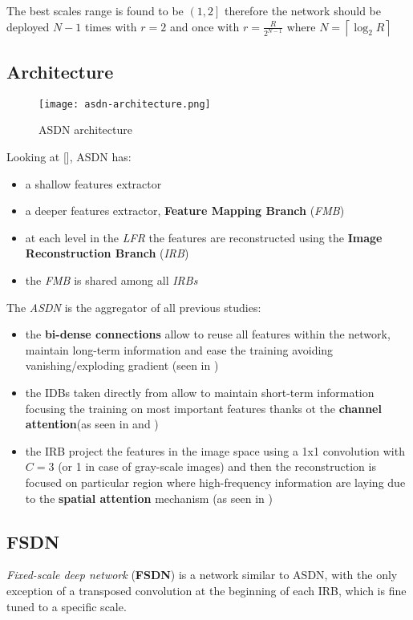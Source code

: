 The best scales range is found to be $\left(1,2 \right]$ therefore the network should be deployed $N-1$ times with $r=2$ and once with $r=\frac{R}{2^{N-1}}$ where $N=\left\lceil\log_2 R \right\rceil$

\subsection{Architecture}
\begin{figure}
    \centering
    \texttt{[image: asdn-architecture.png]}
    \caption{ASDN architecture}\label{asdn:model}
\end{figure}

Looking at [], ASDN has:
\begin{itemize}
    \item a shallow features extractor
    \item a deeper features extractor, \textbf{Feature Mapping Branch} (\textit{FMB})
    \item at each level in the \textit{LFR} the features are reconstructed using the \textbf{Image Reconstruction Branch} (\textit{IRB})
    \item the \textit{FMB} is shared among all \textit{IRBs}
\end{itemize}

The \textit{ASDN} is the aggregator of all previous studies:
\begin{itemize}
    \item the \textbf{bi-dense connections} allow to reuse all features within the network, maintain long-term information and ease the training avoiding vanishing/exploding gradient (seen in )
    \item the IDBs taken directly from  allow to maintain short-term information focusing the training on most important features thanks ot the \textbf{channel attention}(as seen in  and )
    \item the IRB project the features in the image space using a 1x1 convolution with $C=3$ (or 1 in case of gray-scale images) and then the reconstruction is focused on particular region where high-frequency information are laying due to the \textbf{spatial attention} mechanism (as seen in )
\end{itemize}

\subsection{FSDN}
\textit{Fixed-scale deep network} (\textbf{FSDN}) is a network similar to ASDN, with the only exception of a transposed convolution at the beginning of each IRB, which is fine tuned to a specific scale.


